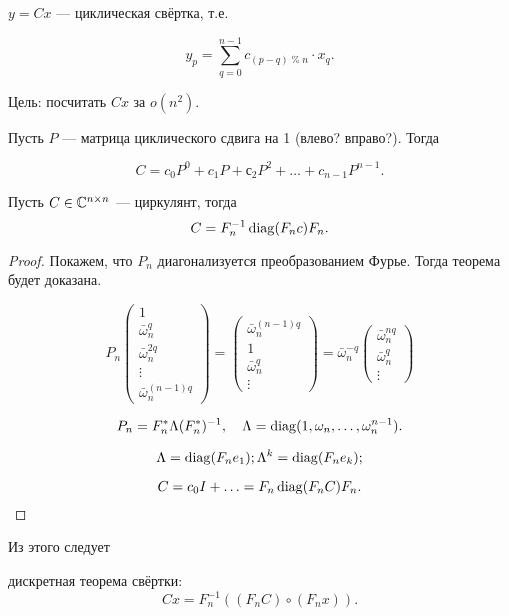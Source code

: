$y = C x$ --- циклическая свёртка, т.е.

\[
    y_p = \sum_{q = 0}^{n - 1} c_{(p - q) \;\%\; n} \cdot x_q.
\]

Цель: посчитать $C x$ за $o(n^2)$.

Пусть $P$ --- матрица циклического сдвига на 1 (влево? вправо?). Тогда

\[
    C = c_0 P^0 + c_1 P + с_2 P^2 + \ldots + c_{n - 1} P^{n - 1}.
\]

\begin{theorem} Пусть $C \in \mathbb{C}^{n \times n}$ --- циркулянт, тогда
    \[
        C = F_n^{-1} \operatorname{diag}(F_n c) F_n.
    \]
\end{theorem}

\begin{proof}
    Покажем, что $P_n$ диагонализуется преобразованием Фурье. Тогда теорема
    будет доказана.

    \[
        P_n \begin{pmatrix}
            1 \\ \bar{\omega}_n^q \\ \bar{\omega}_n^{2 q} \\ \vdots \\
            \bar{\omega}_n^{(n - 1) q}
        \end{pmatrix}
        = \begin{pmatrix}
            \bar{\omega}_n^{(n - 1) q} \\ 1 \\ \bar{\omega}_n^q \\ \vdots
        \end{pmatrix}
        = \bar{\omega}_n^{-q} \begin{pmatrix}
            \bar{\omega}_n^{nq} \\ \bar{\omega}_n^q \\ \vdots
        \end{pmatrix}
    \]

    \[
        P_n = F_n^* \Lambda (F_n^*)^{-1},
        \quad \Lambda = \operatorname{diag}(1, \omega_n, \dots, \omega_n^{n - 1}).
    \]

    \[
        \Lambda = \operatorname{diag}(F_n e_1); \Lambda^k = \operatorname{diag}(F_n e_k);
    \]

    \[
        C = c_0 I + \ldots = F_n \operatorname{diag}(F_n C) F_n.
    \]
\end{proof}

Из этого следует

\begin{theorem} дискретная теорема свёртки:
    \[
        C x = F_n^{-1} ( (F_n C) \circ (F_n x)).
    \]
\end{theorem}

